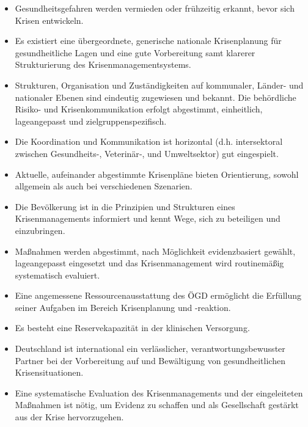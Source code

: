 \documentclass{article}
\begin{document}
\begin{itemize}
\item Gesundheitsgefahren werden vermieden oder frühzeitig erkannt, bevor sich Krisen entwickeln. 


\item Es existiert eine übergeordnete, generische nationale Krisenplanung für gesundheitliche Lagen und eine gute Vorbereitung samt klarerer Strukturierung des Krisenmanagementsystems. 


\item Strukturen, Organisation und Zuständigkeiten auf kommunaler, Länder- und nationaler Ebenen sind eindeutig zugewiesen und bekannt. Die behördliche Risiko- und Krisenkommunikation erfolgt abgestimmt, einheitlich, lageangepasst und zielgruppenspezifisch.


\item Die Koordination und Kommunikation ist horizontal (d.h. intersektoral zwischen Gesundheits-, Veterinär‐, und Umweltsektor) gut eingespielt.


\item Aktuelle, aufeinander abgestimmte Krisenpläne bieten Orientierung, sowohl allgemein als auch bei verschiedenen Szenarien.


\item Die Bevölkerung ist in die Prinzipien und Strukturen eines Krisenmanagements informiert und kennt Wege, sich zu beteiligen und einzubringen. 


\item Maßnahmen werden abgestimmt, nach Möglichkeit evidenzbasiert gewählt, lageangepasst eingesetzt und das Krisenmanagement wird routinemäßig systematisch evaluiert.


\item Eine angemessene Ressourcenausstattung des ÖGD ermöglicht die Erfüllung seiner Aufgaben im Bereich Krisenplanung und -reaktion.


\item Es besteht eine Reservekapazität in der klinischen Versorgung. 


\item Deutschland ist international ein verlässlicher, verantwortungsbewusster Partner bei der Vorbereitung auf und Bewältigung von gesundheitlichen Krisensituationen. 


\item Eine systematische Evaluation des Krisenmanagements und der eingeleiteten Maßnahmen ist nötig, um Evidenz zu schaffen und als Gesellschaft gestärkt aus der Krise hervorzugehen. 


\end{itemize}
\end{document}

